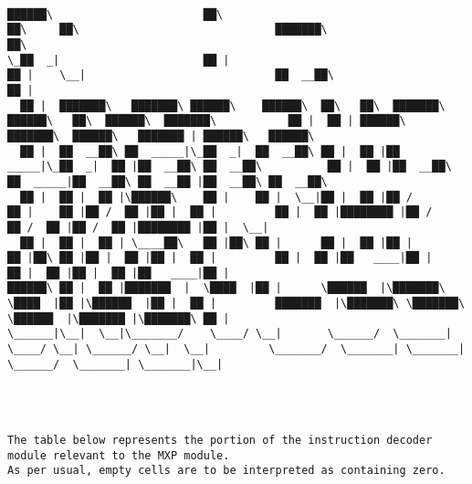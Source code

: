 \documentclass[varwidth=\maxdimen,margin=0.5cm,multi={verbatim}]{standalone}
\begin{document}
\begin{verbatim}

██████\                       ██\                                     ██\     ██\                              ███████\                                      ██\
\_██  _|                      ██ |                                    ██ |    \__|                             ██  __██\                                     ██ |
  ██ |  ███████\   ███████\ ██████\    ██████\  ██\   ██\  ███████\ ██████\   ██\  ██████\  ███████\           ██ |  ██ | ██████\   ███████\  ██████\   ███████ | ██████\   ██████\
  ██ |  ██  __██\ ██  _____|\_██  _|  ██  __██\ ██ |  ██ |██  _____|\_██  _|  ██ |██  __██\ ██  __██\          ██ |  ██ |██  __██\ ██  _____|██  __██\ ██  __██ |██  __██\ ██  __██\
  ██ |  ██ |  ██ |\██████\    ██ |    ██ |  \__|██ |  ██ |██ /        ██ |    ██ |██ /  ██ |██ |  ██ |         ██ |  ██ |████████ |██ /      ██ /  ██ |██ /  ██ |████████ |██ |  \__|
  ██ |  ██ |  ██ | \____██\   ██ |██\ ██ |      ██ |  ██ |██ |        ██ |██\ ██ |██ |  ██ |██ |  ██ |         ██ |  ██ |██   ____|██ |      ██ |  ██ |██ |  ██ |██   ____|██ |
██████\ ██ |  ██ |███████  |  \████  |██ |      \██████  |\███████\   \████  |██ |\██████  |██ |  ██ |         ███████  |\███████\ \███████\ \██████  |\███████ |\███████\ ██ |
\______|\__|  \__|\_______/    \____/ \__|       \______/  \_______|   \____/ \__| \______/ \__|  \__|         \_______/  \_______| \_______| \______/  \_______| \_______|\__|




The table below represents the portion of the instruction decoder module relevant to the MXP module.
As per usual, empty cells are to be interpreted as containing zero.



\end{verbatim}
\end{document}
